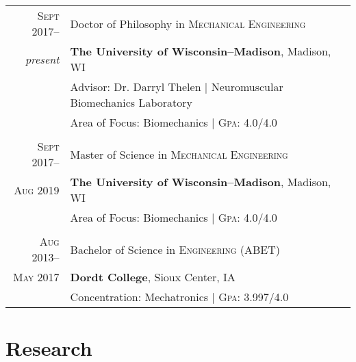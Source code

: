 \documentclass[a4paper,10pt]{article} %
\begin{document}
\begin{tabular}{r|p{11cm}}	

\textsc{Sept} 2017-- & Doctor of Philosophy in \textsc{Mechanical Engineering} \\
\emph{present} & \textbf{The University of Wisconsin--Madison}, Madison, WI \\
& Advisor: Dr. Darryl Thelen | Neuromuscular Biomechanics Laboratory \\
& Area of Focus: Biomechanics | \textsc{Gpa}: 4.0/4.0 \\
& \\


\textsc{Sept 2017}-- & Master of Science in \textsc{Mechanical Engineering} \\
\textsc{Aug 2019} & \textbf{The University of Wisconsin--Madison}, Madison, WI \\
& Area of Focus: Biomechanics | \textsc{Gpa}: 4.0/4.0 \\
& \\


\textsc{Aug} 2013--& Bachelor of Science in \textsc{Engineering} (ABET)\\
\textsc{May} 2017 & \textbf{Dordt College}, Sioux Center, IA \\
& Concentration: Mechatronics | \textsc{Gpa}: 3.997/4.0 \\

\end{tabular}


\section{Research}
\end{document}
